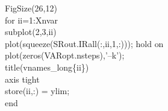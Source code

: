 \hspace{1mm}\hspace{5mm} \hspace{5mm} \hspace{5mm} FigSize(26,12) \\ 
\hspace{1mm}\hspace{5mm} \hspace{5mm} \hspace{5mm} \textcolor{matlabblue}{for} ii=1:Xnvar \\ 
\hspace{1mm}\hspace{5mm} \hspace{5mm} \hspace{5mm} \hspace{5mm} subplot(2,3,ii) \\ 
\hspace{1mm}\hspace{5mm} \hspace{5mm} \hspace{5mm} \hspace{5mm} plot(squeeze(SRout.IRall(:,ii,1,:))); hold on \\ 
\hspace{1mm}\hspace{5mm} \hspace{5mm} \hspace{5mm} \hspace{5mm} plot(zeros(VARopt.nsteps),\textcolor{matlabpurple}{'--k'}); \\ 
\hspace{1mm}\hspace{5mm} \hspace{5mm} \hspace{5mm} \hspace{5mm} title(vnames\_long\{ii\}) \\ 
\hspace{1mm}\hspace{5mm} \hspace{5mm} \hspace{5mm} \hspace{5mm} axis tight \\ 
\hspace{1mm}\hspace{5mm} \hspace{5mm} \hspace{5mm} \hspace{5mm} 	store(ii,:) = ylim; \\ 
\hspace{1mm}\hspace{5mm} \hspace{5mm} \hspace{5mm} \textcolor{matlabblue}{end} \\ 
